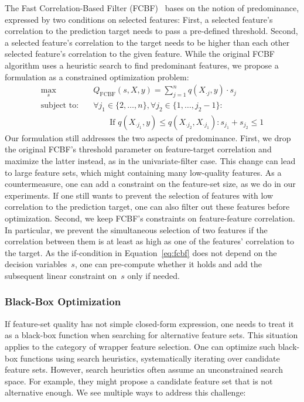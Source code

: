 \documentclass{article}
\theoremstyle{definition}
\begin{document}
The Fast Correlation-Based Filter (FCBF)~\cite{yu2003feature} bases on the notion of predominance, expressed by two conditions on selected features:
First, a selected feature's correlation to the prediction target needs to pass a pre-defined threshold.
Second, a selected feature's correlation to the target needs to be higher than each other selected feature's correlation to the given feature.
While the original FCBF algorithm uses a heuristic search to find predominant features, we propose a formulation as a constrained optimization problem:
%
\begin{equation}
	\begin{aligned}
		\max_s &\quad Q_{\text{FCBF}}(s,X,y) = \sum_{j=1}^{n} q(X_{\cdot{}j},y) \cdot s_j \\
		\text{subject to:} &\quad \forall j_1 \in \{2, \dots, n\}, \forall j_2 \in \{1, \dots, j_2 - 1\}: \\
		&\quad \quad\quad \text{If } q(X_{\cdot{}j_1},y) \leq q(X_{\cdot{}j_2}, X_{\cdot{}j_1}): s_{j_1} + s_{j_2} \leq 1
	\end{aligned}
	\label{eq:fcbf}
\end{equation}
%
Our formulation still addresses the two aspects of predominance.
First, we drop the original FCBF's threshold parameter on feature-target correlation and maximize the latter instead, as in the univariate-filter case.
This change can lead to large feature sets, which might containing many low-quality features.
As a countermeasure, one can add a constraint on the feature-set size, as we do in our experiments.
If one still wants to prevent the selection of features with low correlation to the prediction target, one can also filter out these features before optimization.
Second, we keep FCBF's constraints on feature-feature correlation.
In particular, we prevent the simultaneous selection of two features if the correlation between them is at least as high as one of the features' correlation to the target.
As the if-condition in Equation~\ref{eq:fcbf} does not depend on the decision variables~$s$, one can pre-compute whether it holds and add the subsequent linear constraint on~$s$ only if needed.

\subsubsection{Black-Box Optimization}
\label{sec:approach:objectives:black-box}

If feature-set quality has not simple closed-form expression, one needs to treat it as a black-box function when searching for alternative feature sets.
This situation applies to the category of wrapper feature selection.
One can optimize such black-box functions using search heuristics, systematically iterating over candidate feature sets.
However, search heuristics often assume an unconstrained search space.
For example, they might propose a candidate feature set that is not alternative enough.
We see multiple ways to address this challenge:
\end{document}
